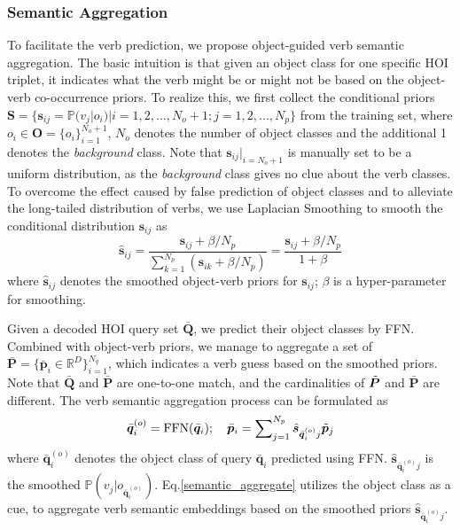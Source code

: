 \documentclass[letterpaper]{article} %
\begin{document}
\subsubsection{Semantic Aggregation} To facilitate the verb prediction, we propose object-guided verb semantic aggregation. The basic intuition is that given an object class for one specific HOI triplet, it indicates what the verb might be or might not be based on the object-verb co-occurrence priors. To realize this, we first collect the conditional priors $\bm{S} = \{ \bm{s}_{ij} = \mathbb{P}(v_j|o_i) | i = 1,2,...,N_o+1; j = 1,2,...,N_p \}$ from the training set, where $o_i \in \bm{O} = \{o_i\}_{i=1}^{N_o+1}$, $N_o$ denotes the number of object classes and the additional 1 denotes the \textit{background} class. Note that $\bm{s}_{i j}|_{i=N_o+1}$ is manually set to be a uniform distribution, as the \textit{background} class gives no clue about the verb classes. To overcome the effect caused by false prediction of object classes and to alleviate the long-tailed distribution of verbs, we use Laplacian Smoothing \cite{zhai2004smoothingmethods} to smooth the conditional distribution $\bm{s}_{ij}$ as 
\begin{equation}  \label{smoothing_probability}
    \hat{\bm{s}}_{ij} = \frac{\bm{s}_{ij} + \beta / N_p}{\sum\nolimits_{k=1}^{N_p}{(\bm{s}_{ik} + \beta / N_p )}} = \frac{\bm{s}_{ij} + \beta / N_p}{1 + \beta} 
\end{equation}
where $\hat{\bm{s}}_{ij} $ denotes the smoothed object-verb priors for $\bm{s}_{ij}$; $\beta$ is a hyper-parameter for smoothing.

Given a decoded HOI query set $\bar{\bm{Q}}$, we predict their object classes by FFN. Combined with object-verb priors, we manage to aggregate a set of $\bar{\bm{P}} = \{ \bar{\bm{p}}_i \in \mathbb{R}^D \}_{i=1}^{N_q}$, which indicates a verb guess based on the smoothed priors. Note that $\bar{\bm{Q}}$ and $\bar{\bm{P}}$ are one-to-one match, and the cardinalities of $\Tilde{\bm{P}}$ and $\bar{\bm{P}}$ are different. The verb semantic aggregation process can be formulated as
\begin{equation}\label{semantic_aggregate}
    \bar{\bm{q}}_i^{(o)} = {\rm FFN}(\bar{\bm{q}}_i); \quad
    \bar{\bm{p}}_i =  \sum\nolimits_{j=1}^{N_p}{\hat{\bm{s}}_{\bar{\bm{q}}_i^{(o)}    j} \Tilde{\bm{p}}_j}
\end{equation}
where $\bar{\bm{q}}_i^{(o)}$ denotes the object class of query $\bar{\bm{q}}_i$ predicted using FFN. $\hat{\bm{s}}_{\bar{\bm{q}}_i^{(o)} j}$ is the smoothed $\mathbb{P}(v_j|o_{\bar{\bm{q}}_i^{(o)}})$. Eq.\ref{semantic_aggregate} utilizes the object class as a cue, to aggregate verb semantic embeddings based on the smoothed priors $\hat{\bm{s}}_{\bar{\bm{q}}_i^{(o)} j}$. 
\end{document}
